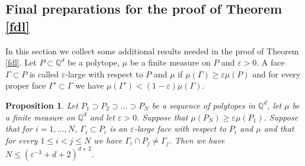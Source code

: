 \documentclass{daj}
\renewcommand{\le}{\leqslant}
\renewcommand{\ge}{\geqslant}
\newcommand{\Q}{\mathbb Q}
\newtheorem{prop}[theorem]{Proposition}
\theoremstyle{definition}
\theoremstyle{remark}
\theoremstyle{definition}
\theoremstyle{definition}
\begin{document}
\subsection{Final preparations for the proof of Theorem \ref{fdl}}

In this section we collect some additional results needed in the proof of Theorem \ref{fdl}. Let $P \subset \Q^d$ be a polytope, $\mu$ be a finite measure on $P$ and $\varepsilon > 0$. A face $\Gamma \subset P$ is called $\varepsilon$-large with respect to $P$ and $\mu$ if $\mu(\Gamma) \ge \varepsilon \mu(P)$ and for every proper face $\Gamma' \subset \Gamma$ we have $\mu(\Gamma') < (1-\varepsilon)\mu(\Gamma)$. 

\begin{prop}\label{large}
    Let $P_1 \supset P_2 \supset \ldots \supset P_N$ be a sequence of polytopes in $\Q^d$, let $\mu$ be a finite measure on $\Q^d$ and let $\varepsilon >0$. Suppose that $\mu(P_N) \ge \varepsilon \mu(P_1)$.
    Suppose that for $i=1, \ldots, N$, $\Gamma_i \subset P_i$ is an $\varepsilon$-large face with respect to $P_i$ and $\mu$ and that for every $1\le i < j \le N$ we have $\Gamma_i \cap P_j \neq \Gamma_j$. Then we have $N \le (\varepsilon^{-3}+d+2)^{d+2}$.
\end{prop}
\end{document}
